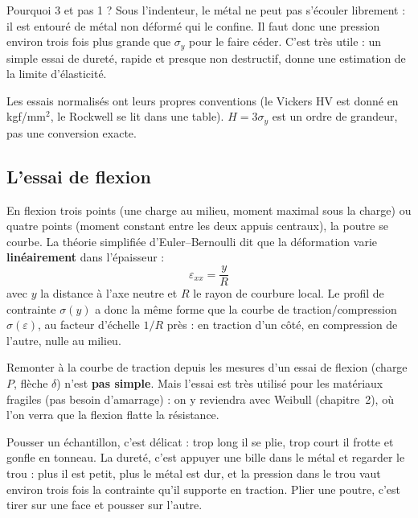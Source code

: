 Pourquoi 3 et pas 1 ? Sous l'indenteur, le métal ne peut pas s'écouler librement : il est
entouré de métal non déformé qui le confine. Il faut donc une pression environ trois fois plus
grande que $\sigma_y$ pour le faire céder. C'est très utile : un simple essai de dureté, rapide
et presque non destructif, donne une estimation de la limite d'élasticité.

\begin{warnbox}[title=Attention aux unités]
Les essais normalisés ont leurs propres conventions (le Vickers HV est donné en kgf/mm$^2$, le
Rockwell se lit dans une table). $H = 3\sigma_y$ est un ordre de grandeur, pas une conversion
exacte.
\end{warnbox}

\subsection*{L'essai de flexion}


En flexion trois points (une charge au milieu, moment maximal sous la charge) ou quatre points
(moment constant entre les deux appuis centraux), la poutre se courbe. La théorie simplifiée
d'Euler--Bernoulli dit que la déformation varie \textbf{linéairement} dans l'épaisseur :
\[ \varepsilon_{xx} = \frac{y}{R} \]
avec $y$ la distance à l'axe neutre et $R$ le rayon de courbure local. Le profil de contrainte
$\sigma(y)$ a donc la même forme que la courbe de traction/compression $\sigma(\varepsilon)$,
au facteur d'échelle $1/R$ près : en traction d'un côté, en compression de l'autre, nulle au
milieu.

\begin{warnbox}[title={Simple à faire, difficile à exploiter}]
Remonter à la courbe de traction depuis les mesures d'un essai de flexion (charge $P$,
flèche $\delta$) n'est \textbf{pas simple}. Mais l'essai est très utilisé pour les matériaux
fragiles (pas besoin d'amarrage) : on y reviendra avec Weibull (chapitre~2), où l'on verra
que la flexion \og flatte\fg{} la résistance.
\end{warnbox}

\begin{goatbox}
Pousser un échantillon, c'est délicat : trop long il se plie, trop court il frotte et gonfle
en tonneau. La dureté, c'est appuyer une bille dans le métal et regarder le trou : plus il est
petit, plus le métal est dur, et la pression dans le trou vaut environ trois fois la contrainte
qu'il supporte en traction. Plier une poutre, c'est tirer sur une face et pousser sur l'autre.
\end{goatbox}

